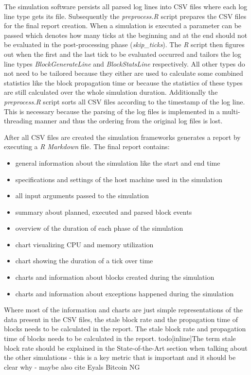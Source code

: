 The simulation software persists all parsed log lines into CSV files where each log line type gets its file.
Subsequently the \textit{preprocess.R} script prepares the CSV files for the final report creation.
When a simulation is executed a parameter can be passed which denotes how many ticks at the beginning and at the end should not be evaluated in the post-processing phase (\textit{skip\_ticks}).
The \textit{R} script then figures out when the first and the last tick to be evaluated occurred and tailors the log line types \textit{BlockGenerateLine} and \textit{BlockStatsLine} respectively.
All other types do not need to be tailored because they either are used to calculate some combined statistics like the block propagation time or because the statistics of these types are still calculated over the whole simulation duration.
Additionally the \textit{preprocess.R} script sorts all CSV files according to the timestamp of the log line.
This is necessary because the parsing of the log files is implemented in a multi-threading manner and thus the ordering from the original log files is lost.

After all CSV files are created the simulation frameworks generates a report by executing a \textit{R Markdown} file.
The final report contains:
\begin{itemize}
	\item general information about the simulation like the start and end time
	\item specifications and settings of the host machine used in the simulation
	\item all input arguments passed to the simulation
	\item summary about planned, executed and parsed block events
	\item overview of the duration of each phase of the simulation
	\item chart visualizing CPU and memory utilization
	\item chart showing the duration of a tick over time
	\item charts and information about blocks created during the simulation
	\item charts and information about exceptions happened during the simulation
\end{itemize}

Where most of the information and charts are just simple representations of the data present in the CSV files, the stale block rate and the propagation time of blocks needs to be calculated in the report.
	The stale block rate and propagation time of blocks needs to be calculated in the report.
todo[inline]{The term stale block rate should be explained in the State-of-the-Art section when talking about the other simulations - this is a key metric that is important and it should be clear why - maybe also cite Eyals Bitcoin NG}

